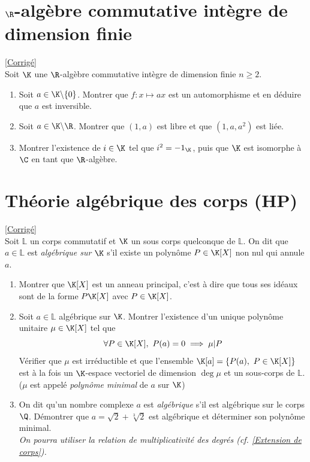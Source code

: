\documentclass[8pt]{book}
\begin{document}
	\section{$\R$-algèbre commutative intègre de dimension finie }
	\label{R algèbre commutative intègre de dimension finie}
	\textcolor{blue}{\hyperref[R algèbre commutative intègre de dimension finie corrigé]{[Corrigé]}}\\
	Soit $\K$ une $\R$-algèbre commutative intègre de dimension finie $n\geq 2$.
	\begin{enumerate}
		\item Soit $a\in \K\backslash\{0\}$. Montrer que $f:x\mapsto ax$ est un automorphisme et en déduire que $a$ est inversible.
		\item Soit $a\in \K\backslash\R$. Montrer que $(1,a)$ est libre et que $(1,a,a^2)$ est liée.
		\item Montrer l'existence de $i\in \K$ tel que $i^2=-1_\K$, puis que $\K$ est isomorphe à $\C$ en tant que $\R$-algèbre.
	\end{enumerate}
	
	\section{Théorie algébrique des corps  (HP)}
	\label{Théorie algébrique des corps}
	\textcolor{blue}{\hyperref[Théorie algébrique des corps corrigé]{[Corrigé]}}\\
	Soit $\mathbb L$ un corps commutatif et $\K$ un sous corps quelconque de $\mathbb L$. On dit que $a\in \mathbb L$ est \textit{algébrique sur $\K$} s'il existe un polynôme $P\in \K[X]$ non nul qui annule $a$.
	\begin{enumerate}
		\item Montrer que $\K[X]$ est un anneau principal, c'est à dire que tous ses idéaux sont de la forme $P\K[X]$ avec $P\in \K[X]$.
		\item Soit $a\in \mathbb L$ algébrique sur $\K$. Montrer l'existence d'un unique polynôme unitaire $\mu\in \K[X]$ tel que
		$$\forall P\in \K[X],\ P(a)=0\implies \mu|P$$
		Vérifier que $\mu$ est irréductible et que l'ensemble $\K[a]=\{P(a),\ P\in \K[X]\}$ est à la fois un $\K$-espace vectoriel de dimension $\deg\mu$ et un sous-corps de $\mathbb L$. ($\mu$ est appelé \textit{polynôme minimal} de $a$ sur $\K$)
		\item On dit qu'un nombre complexe $a$ est \textit{algébrique} s'il est algébrique sur le corps $\Q$. Démontrer que $a=\sqrt 2+\sqrt[3]2$ est algébrique et déterminer son polynôme minimal.\\
		\textit{On pourra utiliser la relation de multiplicativité des degrés (cf. \ref{Extension de corps}).}
	\end{enumerate}
	
\end{document}
